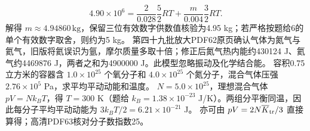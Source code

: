 \[
4.90\times10^6=\frac{2}{0.028}\frac52RT+\frac{m}{0.004}\frac32RT .
\]
解得 $m\approx4.94860\,\mathrm{kg}$，保留三位有效数字供数值核验为4.95 kg；若严格按题给6的单个有效数字取舍，则约为5 kg。
\crosscheck 第四十九批放大PDF62原页确认气体为氮气与氦气，旧版将氦误识为氩，摩尔质量多取十倍；修正后氮气热内能约430124 J、氦气约4469876 J，两者之和为4900000 J。此模型忽略振动及化学结合能。
\problemtext 容积0.75立方米的容器含 $1.0\times10^{25}$ 个氧分子和 $4.0\times10^{25}$ 个氮分子，混合气体压强 $2.76\times10^5$ Pa，求平均平动动能和温度。
\workings $N=5.0\times10^{25}$，理想混合气体 $pV=Nk_BT$，得 $T=300$ K（题给 $k_B=1.38\times10^{-23}$ J/K）。两组分平衡同温，因此每分子平均平动动能为 $3k_BT/2=6.21\times10^{-21}$ J。
\crosscheck 亦可由 $pV=2N\overline K_{\rm tr}/3$ 直接算得；高清PDF63核对分子数指数25。
